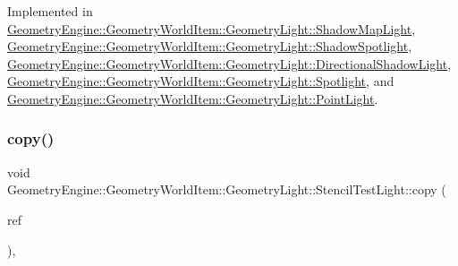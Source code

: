 Implemented in \mbox{\hyperlink{class_geometry_engine_1_1_geometry_world_item_1_1_geometry_light_1_1_shadow_map_light_a48eb6af2e6bb8487568ee4265fbc49ee}{Geometry\+Engine\+::\+Geometry\+World\+Item\+::\+Geometry\+Light\+::\+Shadow\+Map\+Light}}, \mbox{\hyperlink{class_geometry_engine_1_1_geometry_world_item_1_1_geometry_light_1_1_shadow_spotlight_a0ea8fd05d26f6e780d352168c28f940d}{Geometry\+Engine\+::\+Geometry\+World\+Item\+::\+Geometry\+Light\+::\+Shadow\+Spotlight}}, \mbox{\hyperlink{class_geometry_engine_1_1_geometry_world_item_1_1_geometry_light_1_1_directional_shadow_light_ae5016cad41a62c4c870a942acc3f9afe}{Geometry\+Engine\+::\+Geometry\+World\+Item\+::\+Geometry\+Light\+::\+Directional\+Shadow\+Light}}, \mbox{\hyperlink{class_geometry_engine_1_1_geometry_world_item_1_1_geometry_light_1_1_spotlight_a7feb062f72b8110cf7d8d614d2daad92}{Geometry\+Engine\+::\+Geometry\+World\+Item\+::\+Geometry\+Light\+::\+Spotlight}}, and \mbox{\hyperlink{class_geometry_engine_1_1_geometry_world_item_1_1_geometry_light_1_1_point_light_a68321b758cff76fa55f3cd5ef2824035}{Geometry\+Engine\+::\+Geometry\+World\+Item\+::\+Geometry\+Light\+::\+Point\+Light}}.

\mbox{\label{class_geometry_engine_1_1_geometry_world_item_1_1_geometry_light_1_1_stencil_test_light_aa9a8a9c606ffbf686a951122b9b0fe65}} 
\subsubsection{\texorpdfstring{copy()}{copy()}}
{\footnotesize\ttfamily void Geometry\+Engine\+::\+Geometry\+World\+Item\+::\+Geometry\+Light\+::\+Stencil\+Test\+Light\+::copy (\begin{DoxyParamCaption}\item[{const \mbox{\hyperlink{class_geometry_engine_1_1_geometry_world_item_1_1_geometry_light_1_1_stencil_test_light}{Stencil\+Test\+Light}} \&}]{ref }\end{DoxyParamCaption})\hspace{0.3cm}{\ttfamily [protected]}, {\ttfamily [virtual]}}

